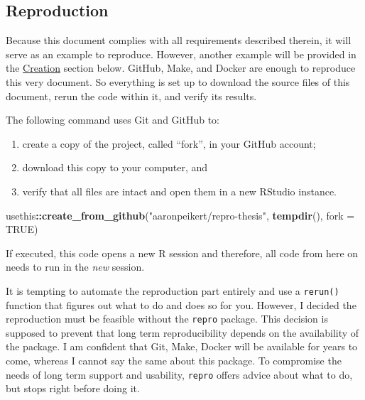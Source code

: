 \documentclass[12pt,a4paper,]{article}
\newenvironment{Shaded}{\begin{snugshade}}{\end{snugshade}}
\newcommand{\DataTypeTok}[1]{\textcolor[rgb]{0.13,0.29,0.53}{#1}}
\newcommand{\KeywordTok}[1]{\textcolor[rgb]{0.13,0.29,0.53}{\textbf{#1}}}
\newcommand{\NormalTok}[1]{#1}
\newcommand{\OperatorTok}[1]{\textcolor[rgb]{0.81,0.36,0.00}{\textbf{#1}}}
\newcommand{\OtherTok}[1]{\textcolor[rgb]{0.56,0.35,0.01}{#1}}
\newcommand{\StringTok}[1]{\textcolor[rgb]{0.31,0.60,0.02}{#1}}
\providecommand{\tightlist}{%
  \setlength{\itemsep}{0pt}\setlength{\parskip}{0pt}}
\begin{document}
\hypertarget{reproduction}{%
\subsection{Reproduction}\label{reproduction}}

Because this document complies with all requirements described therein, it will serve as an example to reproduce.
However, another example will be provided in the \protect\hyperlink{creation}{Creation} section below.
GitHub, Make, and Docker are enough to reproduce this very document.
So everything is set up to download the source files of this document, rerun the code within it, and verify its results.

The following command uses Git and GitHub to:

\begin{enumerate}
\def\labelenumi{\arabic{enumi}.}
\tightlist
\item
  create a copy of the project, called ``fork'', in your GitHub account;
\item
  download this copy to your computer, and
\item
  verify that all files are intact and open them in a new RStudio instance.
\end{enumerate}

\begin{Shaded}
\begin{Highlighting}[]
\NormalTok{usethis}\OperatorTok{::}\KeywordTok{create_from_github}\NormalTok{(}\StringTok{"aaronpeikert/repro-thesis"}\NormalTok{,}
                            \KeywordTok{tempdir}\NormalTok{(),}
                            \DataTypeTok{fork =} \OtherTok{TRUE}\NormalTok{)}
\end{Highlighting}
\end{Shaded}

If executed, this code opens a new R session and therefore, all code from here on needs to run in the \emph{new} session.

It is tempting to automate the reproduction part entirely and use a \texttt{rerun()} function that figures out what to do and does so for you.
However, I decided the reproduction must be feasible without the \texttt{repro} package.
This decision is supposed to prevent that long term reproducibility depends on the availability of the package.
I am confident that Git, Make, Docker will be available for years to come, whereas I cannot say the same about this package.
To compromise the needs of long term support and usability, \texttt{repro} offers advice about what to do, but stops right before doing it.
\end{document}
